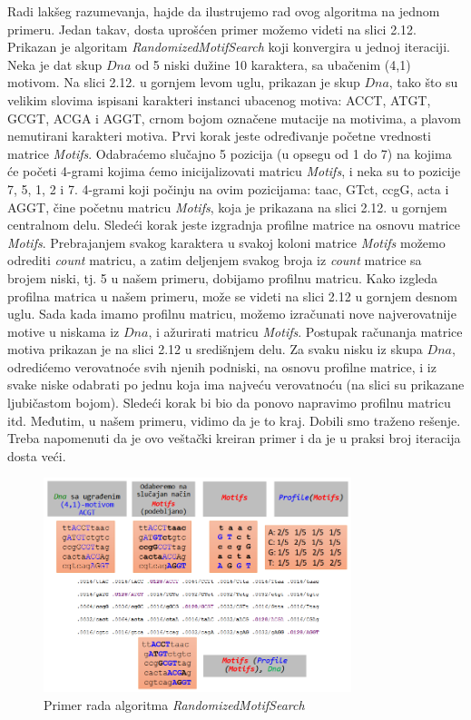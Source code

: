 Radi lakšeg razumevanja, hajde da ilustrujemo rad ovog algoritma na jednom primeru. Jedan takav, dosta uprošćen primer možemo videti na slici 2.12. Prikazan je algoritam \textit{RandomizedMotifSearch} koji konvergira u jednoj iteraciji.
Neka je dat skup $Dna$ od 5 niski dužine 10 karaktera, sa ubačenim (4,1) motivom. Na slici 2.12. u gornjem levom uglu, prikazan je skup $Dna$, tako što su velikim slovima ispisani karakteri instanci ubacenog motiva: ACCT, ATGT, GCGT, ACGA i AGGT, crnom bojom označene mutacije na motivima, a plavom nemutirani karakteri motiva. Prvi korak jeste određivanje početne vrednosti matrice \textit{Motifs}. Odabraćemo slučajno 5 pozicija (u opsegu od 1 do 7) na kojima će početi 4-grami kojima ćemo inicijalizovati matricu \textit{Motifs}, i neka su to pozicije 7, 5, 1, 2 i 7. 4-grami koji počinju na ovim pozicijama: taac, GTct, ccgG, acta i AGGT, čine početnu matricu \textit{Motifs}, koja je prikazana na slici 2.12. u gornjem centralnom delu. Sledeći korak jeste izgradnja profilne matrice na osnovu matrice \textit{Motifs}. Prebrajanjem svakog karaktera u svakoj koloni matrice \textit{Motifs} možemo odrediti \textit{count} matricu, a zatim deljenjem svakog broja iz \textit{count} matrice sa brojem niski, tj. 5 u našem primeru, dobijamo profilnu matricu. Kako izgleda profilna matrica u našem primeru, može se videti na slici 2.12 u gornjem desnom uglu. Sada kada imamo profilnu matricu, možemo izračunati nove najverovatnije motive u niskama iz $Dna$, i ažurirati matricu \textit{Motifs}. Postupak računanja matrice motiva prikazan je na slici 2.12 u središnjem delu. Za svaku nisku iz skupa $Dna$, odredićemo verovatnoće svih njenih podniski, na osnovu profilne matrice, i iz svake niske odabrati po jednu koja ima najveću verovatnoću (na slici su prikazane ljubičastom bojom). Sledeći korak bi bio da ponovo napravimo profilnu matricu itd. Međutim, u našem primeru, vidimo da je to kraj. Dobili smo traženo rešenje. Treba napomenuti da je ovo veštački kreiran primer i da je u praksi broj iteracija dosta veći.

\begin{figure}[h]
\caption{Primer rada algoritma \textit{RandomizedMotifSearch}}
\centering
\includegraphics[width=0.8\textwidth]{poglavlja/2/slike/69.PNG}
\end{figure}

